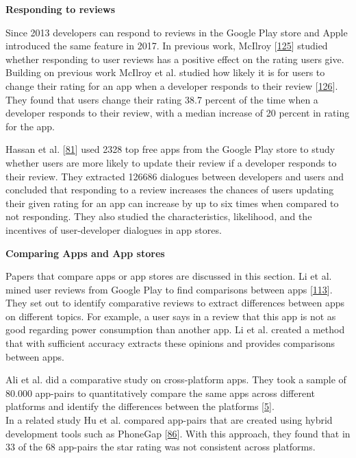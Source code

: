 \documentclass[]{book}
\begin{document}
\textbf{Responding to reviews}

Since 2013 developers can respond to reviews in the Google Play store
and Apple introduced the same feature in 2017. In previous work, McIlroy
{[}\protect\hyperlink{ref-mcilroy2014empirical}{125}{]} studied whether
responding to user reviews has a positive effect on the rating users
give. Building on previous work McIlroy et al. studied how likely it is
for users to change their rating for an app when a developer responds to
their review {[}\protect\hyperlink{ref-mcilroy2017worth}{126}{]}. They
found that users change their rating 38.7 percent of the time when a
developer responds to their review, with a median increase of 20 percent
in rating for the app.

Hassan et al. {[}\protect\hyperlink{ref-hassan2018studying}{81}{]} used
2328 top free apps from the Google Play store to study whether users are
more likely to update their review if a developer responds to their
review. They extracted 126686 dialogues between developers and users and
concluded that responding to a review increases the chances of users
updating their given rating for an app can increase by up to six times
when compared to not responding. They also studied the characteristics,
likelihood, and the incentives of user-developer dialogues in app
stores.

\textbf{Comparing Apps and App stores}

Papers that compare apps or app stores are discussed in this section. Li
et al. mined user reviews from Google Play to find comparisons between
apps {[}\protect\hyperlink{ref-li2017mining}{113}{]}. They set out to
identify comparative reviews to extract differences between apps on
different topics. For example, a user says in a review that this app is
not as good regarding power consumption than another app. Li et al.
created a method that with sufficient accuracy extracts these opinions
and provides comparisons between apps.

Ali et al. did a comparative study on cross-platform apps. They took a
sample of 80.000 app-pairs to quantitatively compare the same apps
across different platforms and identify the differences between the
platforms {[}\protect\hyperlink{ref-ali2017same}{5}{]}.\\
In a related study Hu et al. compared app-pairs that are created using
hybrid development tools such as PhoneGap
{[}\protect\hyperlink{ref-hu2018studying}{86}{]}. With this approach,
they found that in 33 of the 68 app-pairs the star rating was not
consistent across platforms.
\end{document}
